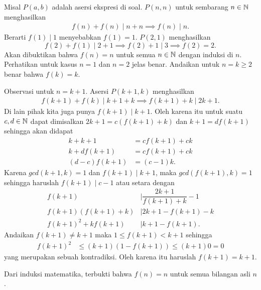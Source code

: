 
\begin{solusi}
    Misal $P(a,b)$ adalah asersi ekspresi di soal. $P(n,n)$ untuk sembarang $n \in \mathbb N$ menghasilkan
    \begin{align*}
        f(n)+f(n) \mid n+n \implies f(n) \mid n.
    \end{align*}
    Berarti $f(1) \mid 1$ menyebabkan $f(1)=1$. $P(2,1)$ menghasilkan  
    $$f(2)+f(1) \mid 2+1 \implies f(2)+1 \mid 3 \implies f(2)=2.$$ Akan dibuktikan bahwa $f(n)=n$ untuk semua $n \in \mathbb N$ dengan induksi di $n$.
    Perhatikan untuk kasus $n=1$ dan $n=2$ jelas benar. Andaikan untuk $n=k\ge 2$ benar bahwa $f(k)=k$. 
    
    Observasi untuk $n=k+1$. Asersi $P(k+1,k)$ menghasilkan
    \begin{align*}
        f(k+1)+f(k) \mid k+1 + k \implies f(k+1)+k \mid 2k+1.
    \end{align*}
    Di lain pihak kita juga punya $f(k+1) \mid k+1$. Oleh karena itu untuk suatu $c,d \in \mathbb N$ dapat dimisalkan $2k+1 = c(f(k+1)+k)$ dan $ k+1 = df(k+1) $
    sehingga akan didapat
    \begin{align*}
        k + k+1 &= cf(k+1)+ck\\
        k + df(k+1) &= cf(k+1) + ck\\
        (d-c)f(k+1) &= (c-1)k.
    \end{align*}
    Karena $gcd(k+1,k) =1$ dan $f(k+1) \mid k+1$, maka $gcd(f(k+1),k)=1$ sehingga haruslah $f(k+1) \mid c-1$ atau setara dengan
    \begin{align*}
        f(k+1) &\mid \dfrac{2k+1}{f(k+1)+k} - 1\\
        f(k+1)(f(k+1)+k) &\mid 2k+1 - f(k+1) - k\\
        f(k+1)^2+kf(k+1) &\mid k+1 - f(k+1).
    \end{align*}
    Andaikan $f(k+1) \neq k+1$ maka $1 \le f(k+1) < k+1$ sehingga
    \begin{align*}
        f(k+1)^2 &\le (k+1)(1-f(k+1)) \le (k+1)0 = 0
    \end{align*}
    yang merupakan sebuah kontradiksi. Oleh karena itu haruslah $f(k+1)=k+1$.

    Dari induksi matematika, terbukti bahwa $f(n)=n$ untuk semua bilangan asli $n$.
\end{solusi}